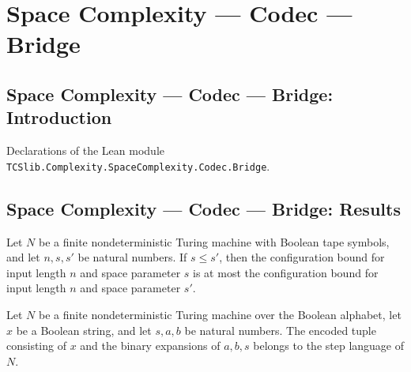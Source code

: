 \section{Space Complexity --- Codec --- Bridge}
\subsection*{Space Complexity --- Codec --- Bridge: Introduction}

Declarations of the Lean module \texttt{TCSlib.Complexity.SpaceComplexity.Codec.Bridge}.

\subsection*{Space Complexity --- Codec --- Bridge: Results}

\begin{lemma}
\label{Complexity.Codec.configBound_mono}
\leanok
{}
Let $N$ be a finite nondeterministic Turing machine with Boolean tape symbols, and let
$n,s,s'$ be natural numbers. If $s\le s'$, then the configuration bound for input length
$n$ and space parameter $s$ is at most the configuration bound for input length $n$ and
space parameter $s'$.
\end{lemma}

\begin{definition}
\label{Complexity.Codec.StepRel}
\leanok
{}
Let $N$ be a finite nondeterministic Turing machine over the Boolean alphabet, let $x$
be a Boolean string, and let $s,a,b$ be natural numbers. The encoded tuple consisting of
$x$ and the binary expansions of $a,b,s$ belongs to the step language of $N$.
\end{definition}

